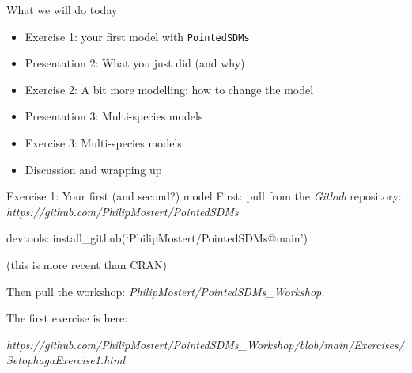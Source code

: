 \documentclass[
  ignorenonframetext,
]{beamer}
\providecommand{\tightlist}{%
  \setlength{\itemsep}{0pt}\setlength{\parskip}{0pt}}\usepackage{longtable,booktabs,array}
\begin{document}
\begin{frame}[fragile]{What we will do today}
\label{what-we-will-do-today}
\begin{itemize}
\tightlist
\item
  Exercise 1: your first model with \texttt{PointedSDMs}
\item
  Presentation 2: What you just did (and why)
\item
  Exercise 2: A bit more modelling: how to change the model
\item
  Presentation 3: Multi-species models
\item
  Exercise 3: Multi-species models
\item
  Discussion and wrapping up
\end{itemize}
\end{frame}

\begin{frame}{Exercise 1: Your first (and second?) model}
\label{exercise-1-your-first-and-second-model}
First: pull from the \emph{Github} repository:
\emph{https://github.com/PhilipMostert/PointedSDMs}

devtools::install\_github(`PhilipMostert/PointedSDMs@main')

(this is more recent than CRAN)

Then pull the workshop: \emph{PhilipMostert/PointedSDMs\_Workshop.}

The first exercise is here:

\emph{https://github.com/PhilipMostert/PointedSDMs\_Workshop/blob/main/Exercises/SetophagaExercise1.html}
\end{frame}
\end{document}
